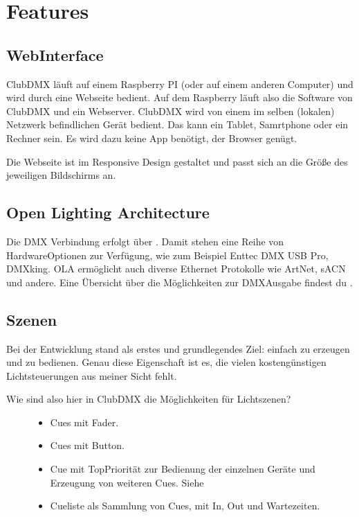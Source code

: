 \documentclass[letterpaper,10pt,ngerman]{sphinxmanual}
\begin{document}
\chapter{Features}
\label{\detokenize{features:features}}\label{\detokenize{features::doc}}

\section{Web\sphinxhyphen{}Interface}
\label{\detokenize{features:web-interface}}
ClubDMX läuft auf einem Raspberry PI (oder auf einem anderen Computer) und
wird durch eine Webseite bedient. Auf dem Raspberry läuft also die Software
von ClubDMX und ein Webserver. ClubDMX wird von einem im selben
(lokalen) Netzwerk befindlichen Gerät bedient. Das kann ein Tablet, Samrtphone
oder ein Rechner sein. Es wird dazu keine App benötigt, der Browser genügt.

Die Webseite ist im Responsive Design gestaltet und passt sich an die
Größe des jeweiligen Bildschirms an.


\section{Open Lighting Architecture}
\label{\detokenize{features:open-lighting-architecture}}
Die DMX Verbindung erfolgt über .
Damit stehen eine Reihe von Hardware\sphinxhyphen{}Optionen zur Verfügung, wie zum Beispiel
Enttec DMX USB Pro, DMXking. OLA ermöglicht auch diverse Ethernet Protokolle
wie ArtNet, sACN und andere. Eine Übersicht über die Möglichkeiten zur
DMX\sphinxhyphen{}Ausgabe findest du .


\section{Szenen}
\label{\detokenize{features:szenen}}
Bei der Entwicklung stand als erstes und grundlegendes Ziel:
 einfach zu erzeugen und zu bedienen. Genau diese
Eigenschaft ist es, die vielen kostengünstigen Lichtsteuerungen
aus meiner Sicht fehlt.
\begin{description}
\item[{Wie sind also hier in ClubDMX die Möglichkeiten für Lichtszenen?}] \leavevmode\begin{itemize}
\item {} 
Cues mit Fader.

\item {} 
Cues mit Button.

\item {} 
Cue mit Top\sphinxhyphen{}Priorität zur Bedienung der einzelnen Geräte und
Erzeugung von weiteren Cues. Siehe {\hyperref[\detokenize{grundlagen:topcuelabel}]{}}

\item {} 
Cueliste als Sammlung von Cues, mit In\sphinxhyphen{}, Out und Wartezeiten.

\end{itemize}

\end{description}
\end{document}
